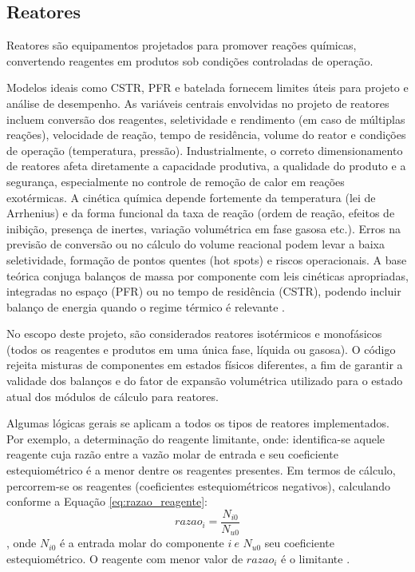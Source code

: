 \subsection{Reatores}

Reatores são equipamentos projetados para promover reações químicas, convertendo reagentes em produtos sob condições controladas de operação.

Modelos ideais como CSTR, PFR e batelada fornecem limites úteis para projeto e análise de desempenho. As variáveis centrais envolvidas no projeto de reatores incluem conversão dos reagentes, seletividade e rendimento (em caso de múltiplas reações), velocidade de reação, tempo de residência, volume do reator e condições de operação (temperatura, pressão). Industrialmente, o correto dimensionamento de reatores afeta diretamente a capacidade produtiva, a qualidade do produto e a segurança, especialmente no controle de remoção de calor em reações exotérmicas. A cinética química depende fortemente da temperatura (lei de Arrhenius) e da forma funcional da taxa de reação (ordem de reação, efeitos de inibição, presença de inertes, variação volumétrica em fase gasosa etc.). Erros na previsão de conversão ou no cálculo do volume reacional podem levar a baixa seletividade, formação de pontos quentes (hot spots) e riscos operacionais. A base teórica conjuga balanços de massa por componente com leis cinéticas apropriadas, integradas no espaço (PFR) ou no tempo de residência (CSTR), podendo incluir balanço de energia quando o regime térmico é relevante \cite{fogler2009,levenspiel2000}.

No escopo deste projeto, são considerados reatores isotérmicos e monofásicos (todos os reagentes e produtos em uma única fase, líquida ou gasosa). O código rejeita misturas de componentes em estados físicos diferentes, a fim de garantir a validade dos balanços e do fator de expansão volumétrica utilizado para o estado atual dos módulos de cálculo para reatores.

Algumas lógicas gerais se aplicam a todos os tipos de reatores implementados. Por exemplo, a determinação do reagente limitante, onde: identifica-se aquele reagente cuja razão entre a vazão molar de entrada e seu coeficiente estequiométrico é a menor dentre os reagentes presentes. Em termos de cálculo, percorrem-se os reagentes (coeficientes estequiométricos negativos), calculando conforme a Equação \ref{eq:razao_reagente}:
\begin{equation}
{razao}_{i} = \frac{N_{i 0}}{N_{u 0}}
\label{eq:razao_reagente}
\end{equation}, onde $N_{i 0}$ é a entrada molar do componente $i \  e$ $N_{u 0}$ seu coeficiente estequiométrico. O reagente com menor valor de ${razao}_{i}$ é o limitante \cite{felder2005}.

